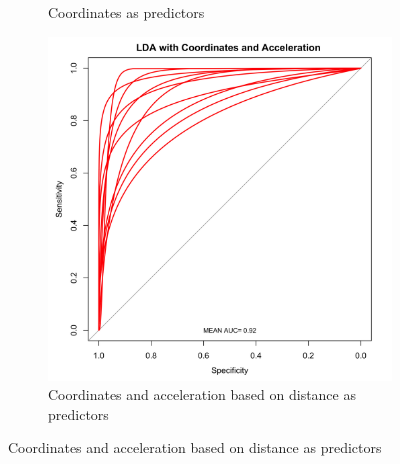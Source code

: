 \documentclass{article}
\begin{document}
\begin{itemize}
\begin{figure}[h]
\begin{subfigure}{0.3\textwidth}
\caption{Coordinates as predictors}
\end{subfigure}
\begin{subfigure}{0.3\textwidth}
\includegraphics[width=\textwidth]{ROC_LDA-CoordsAcc.png}
\caption{Coordinates and acceleration based on distance as predictors}
\end{subfigure}


\end{figure}
\end{itemize}
\end{document}
